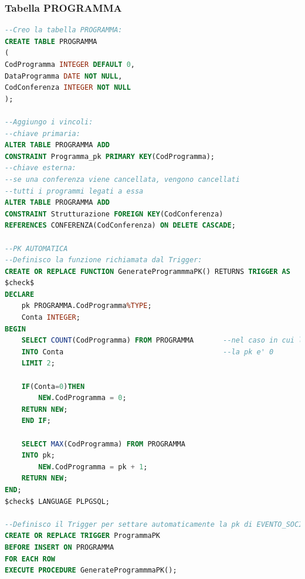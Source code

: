 \documentclass[a4page]{article}
\begin{document}
\subsubsection{Tabella PROGRAMMA}
\begin{lstlisting}[language=SQL,
        deletekeywords={IDENTITY,INT},
        morekeywords={clustered},    
        framesep=10pt,
        framextopmargin=10pt]
--Creo la tabella PROGRAMMA: 
CREATE TABLE PROGRAMMA
(
CodProgramma INTEGER DEFAULT 0,
DataProgramma DATE NOT NULL,
CodConferenza INTEGER NOT NULL
);

--Aggiungo i vincoli:
--chiave primaria:
ALTER TABLE PROGRAMMA ADD
CONSTRAINT Programma_pk PRIMARY KEY(CodProgramma);
--chiave esterna:
--se una conferenza viene cancellata, vengono cancellati
--tutti i programmi legati a essa
ALTER TABLE PROGRAMMA ADD
CONSTRAINT Strutturazione FOREIGN KEY(CodConferenza)
REFERENCES CONFERENZA(CodConferenza) ON DELETE CASCADE;
	
--PK AUTOMATICA
--Definisco la funzione richiamata dal Trigger:
CREATE OR REPLACE FUNCTION GenerateProgrammmaPK() RETURNS TRIGGER AS
$check$
DECLARE
	pk PROGRAMMA.CodProgramma%TYPE;
	Conta INTEGER;
BEGIN
	SELECT COUNT(CodProgramma) FROM PROGRAMMA		--nel caso in cui la tabella sia vuota
	INTO Conta										--la pk e' 0
	LIMIT 2;
	
	IF(Conta=0)THEN				
		NEW.CodProgramma = 0;	
	RETURN NEW;
	END IF;
	
	SELECT MAX(CodProgramma) FROM PROGRAMMA
	INTO pk;
		NEW.CodProgramma = pk + 1;
	RETURN NEW;
END;
$check$ LANGUAGE PLPGSQL;

--Definisco il Trigger per settare automaticamente la pk di EVENTO_SOCIALE:
CREATE OR REPLACE TRIGGER ProgrammaPK
BEFORE INSERT ON PROGRAMMA
FOR EACH ROW
EXECUTE PROCEDURE GenerateProgrammmaPK();        

\end{lstlisting}
\end{document}
